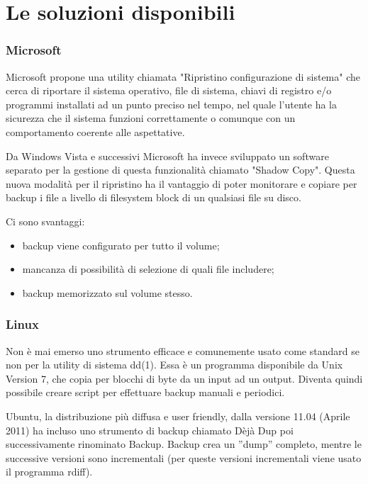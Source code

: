\documentclass{beamer}
\begin{document}
\section{Le soluzioni disponibili}
\begin{frame}
\frametitle{Microsoft}
Microsoft propone una utility chiamata "Ripristino configurazione di sistema" che cerca di riportare il sistema operativo, file di sistema, chiavi di registro e/o programmi installati ad un punto preciso nel tempo, nel quale l'utente ha la sicurezza che il sistema funzioni correttamente o comunque con un comportamento coerente alle aspettative.
\end{frame}

\begin{frame}
Da Windows Vista e successivi Microsoft ha invece sviluppato un software separato per la gestione di questa funzionalit\`a chiamato "Shadow Copy".
\newline
Questa nuova modalit\`a per il ripristino ha il vantaggio di poter monitorare e copiare per backup i file a livello di filesystem block di un qualsiasi file su disco.
\end{frame}

\begin{frame}
Ci sono svantaggi:
\begin{itemize}
\item backup viene configurato per tutto il volume;
\item mancanza di possibilit\`a di selezione di quali file includere;
\item backup memorizzato sul volume stesso.
\end{itemize}
\end{frame}

\begin{frame}
\frametitle{Linux}
Non \`e mai emerso uno strumento efficace e comunemente usato come standard se non per la utility di sistema dd(1).
Essa \`e un programma disponibile da Unix Version 7, che copia per blocchi di byte da un input ad un output. Diventa quindi possibile creare script per effettuare backup manuali e periodici.
\end{frame}

\begin{frame}
Ubuntu, la distribuzione pi\`u diffusa e user friendly, dalla versione 11.04 (Aprile 2011) ha incluso uno strumento di backup chiamato D\`ej\`a Dup poi successivamente rinominato Backup.
\newline
Backup crea un ”dump” completo, mentre le successive versioni sono incrementali (per queste versioni incrementali viene usato il programma rdiff).
\end{frame}
\end{document}
